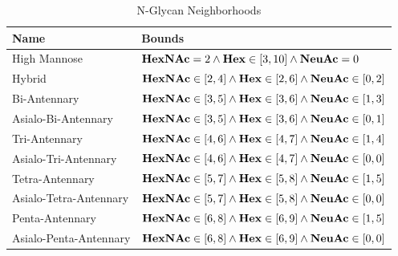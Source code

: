         \begin{table}
            \centering
            \begin{tabular}[h]{l | p{8cm}}
                Name & Bounds \\
                \hline
                High Mannose & ${\bf HexNAc} = 2 \land
                                {\bf Hex} \in [3, 10]
                                \land {\bf NeuAc} = 0$\\
                Hybrid & ${\bf HexNAc} \in [2, 4] \land
                          {\bf Hex} \in [2, 6]
                          \land {\bf NeuAc} \in [0, 2]$\\
                Bi-Antennary & ${\bf HexNAc} \in [3, 5]
                                \land {\bf Hex} \in [3, 6]
                                \land {\bf NeuAc} \in [1, 3]$\\
                Asialo-Bi-Antennary & ${\bf HexNAc} \in [3, 5]
                                \land {\bf Hex} \in [3, 6]
                                \land {\bf NeuAc} \in [0, 1]$\\
                Tri-Antennary & $
                    {\bf HexNAc} \in [4, 6]
                    \land {\bf Hex} \in [4, 7]
                    \land {\bf NeuAc} \in [1, 4]
                $\\
                Asialo-Tri-Antennary & $
                    {\bf HexNAc} \in [4, 6]
                    \land {\bf Hex} \in [4, 7]
                    \land {\bf NeuAc} \in [0, 0]
                $\\
                Tetra-Antennary & $
                    {\bf HexNAc} \in [5, 7]
                    \land {\bf Hex} \in [5, 8]
                    \land {\bf NeuAc} \in [1, 5]
                $\\
                Asialo-Tetra-Antennary & $
                    {\bf HexNAc} \in [5, 7]
                    \land {\bf Hex} \in [5, 8]
                    \land {\bf NeuAc} \in [0, 0]
                $\\
                Penta-Antennary & $
                    {\bf HexNAc} \in [6, 8]
                    \land {\bf Hex} \in [6, 9]
                    \land {\bf NeuAc} \in [1, 5]
                $\\
                Asialo-Penta-Antennary & $
                    {\bf HexNAc} \in [6, 8]
                    \land {\bf Hex} \in [6, 9]
                    \land {\bf NeuAc} \in [0, 0]
                $
            \end{tabular}
            \caption{N-Glycan Neighborhoods}
            \label{tbl:neighborhood_definitions}
        \end{table}


